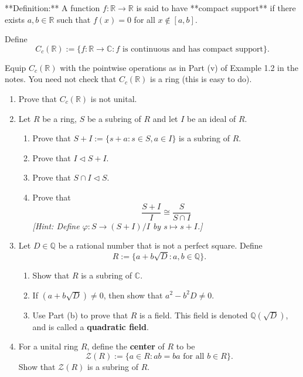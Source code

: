 \documentclass[11pt]{article}
\theoremstyle{definition}
\theoremstyle{remark}
\begin{document}
**Definition:** A function $f : \mathbb{R} \to \mathbb{R}$ is said to have **compact support** if there exists $a, b \in \mathbb{R}$ such that $f(x) = 0$ for all $x \notin [a, b]$.

Define
\[ C_c(\mathbb{R}) := \{ f : \mathbb{R} \to \mathbb{C} : f \text{ is continuous and has compact support} \}. \]

Equip $C_c(\mathbb{R})$ with the pointwise operations as in Part (v) of Example 1.2 in the notes. You need not check that $C_c(\mathbb{R})$ is a ring (this is easy to do).

\begin{enumerate}
    \item Prove that $C_c(\mathbb{R})$ is not unital.

    \item Let $R$ be a ring, $S$ be a subring of $R$ and let $I$ be an ideal of $R$.
    \begin{enumerate}
        \item Prove that $S + I := \{ s + a : s \in S, a \in I \}$ is a subring of $R$.
        \item Prove that $I \lhd S + I$.
        \item Prove that $S \cap I \lhd S$.
        \item Prove that
        \[
        \frac{S + I}{I} \cong \frac{S}{S \cap I}
        \]
        \textit{[Hint: Define $\varphi : S \to (S + I)/I$ by $s \mapsto s + I$.]}
    \end{enumerate}

    \item Let $D \in \mathbb{Q}$ be a rational number that is not a perfect square. Define
    \[
    R := \{ a + b \sqrt{D} : a, b \in \mathbb{Q} \}.
    \]
    \begin{enumerate}
        \item Show that $R$ is a subring of $\mathbb{C}$.
        \item If $(a + b \sqrt{D}) \neq 0$, then show that $a^2 - b^2 D \neq 0$.
        \item Use Part (b) to prove that $R$ is a field.
        This field is denoted $\mathbb{Q}(\sqrt{D})$, and is called a \textbf{quadratic field}.
    \end{enumerate}

    \item For a unital ring $R$, define the \textbf{center} of $R$ to be
    \[
    \mathcal{Z}(R) := \{ a \in R : ab = ba \text{ for all } b \in R \}.
    \]
    Show that $\mathcal{Z}(R)$ is a subring of $R$.
\end{enumerate}
\end{document}
